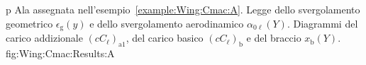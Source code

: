 \documentclass[[12pt,twoside]{book}
\begin{document}
\EnlargedFigureX%
  {p}%
  {%
    \vspace{0.3cm}
  }%
  {
    Ala assegnata nell'esempio~\ref{example:Wing:Cmac:A}.
    Legge dello svergolamento geometrico $\epsilon_\mathrm{g}(y)$ e dello svergolamento
    aerodinamico $\alpha_{0\ell}(Y)$.
    Diagrammi del carico addizionale $(cC_\ell)_\mathrm{a1}$, 
    del carico basico $(cC_\ell)_\mathrm{b}$ e del braccio $x_\mathrm{b}(Y)$.%
  }%
  {fig:Wing:Cmac:Results:A}%
  
  
\end{document}
